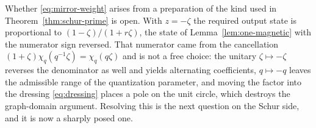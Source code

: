 \begin{remark}
\label{rem:mirror-schur}
Whether \eqref{eq:mirror-weight} arises from a preparation of the kind used in
Theorem~\ref{thm:schur-prime} is open. With $z=-\zeta$ the required output
state is proportional to $(1-\zeta)/(1+r\zeta)$, the state of
Lemma~\ref{lem:one-magnetic} with the numerator sign reversed. That numerator
came from the cancellation $(1+\zeta)\chi_q(q^{-1}\zeta)=\chi_q(q\zeta)$ and
is not a free choice: the unitary $\zeta\mapsto-\zeta$ reverses the
denominator as well and yields alternating coefficients, $q\mapsto-q$ leaves
the admissible range of the quantization parameter, and moving the factor into
the dressing \eqref{eq:dressing} places a pole on the unit circle, which
destroys the graph-domain argument. Resolving this is the next question on the
Schur side, and it is now a sharply posed one.
\end{remark}

